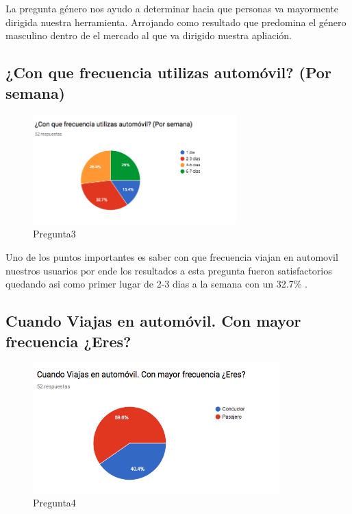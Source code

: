 La pregunta género nos ayudo a determinar hacia que personas va mayormente dirigida nuestra herramienta. Arrojando como resultado que predomina el género masculino dentro de el mercado al que va dirigido nuestra apliación.\\

\subsection{¿Con que frecuencia utilizas automóvil? (Por semana)}

\begin{figure}[htbp!]
	\begin{center}
		\includegraphics[width=0.7\textwidth]{DisenoEstructura/imagenes/Pregunta3}
		\caption{Pregunta3}
		\label{DE/FO/Pregunta3}
	\end{center}
\end{figure}

Uno de los puntos importantes es saber con que frecuencia viajan en automovil nuestros usuarios por ende los resultados a esta pregunta fueron satisfactorios quedando asi como primer lugar de 2-3 dias a la semana con un 32.7\% . \\

\subsection{Cuando Viajas en automóvil. Con mayor frecuencia ¿Eres?}

\begin{figure}[htbp!]
	\begin{center}
		\includegraphics[width=0.85\textwidth]{DisenoEstructura/imagenes/Pregunta4}
		\caption{Pregunta4}
		\label{DE/FO/Pregunta4}
	\end{center}
\end{figure}

